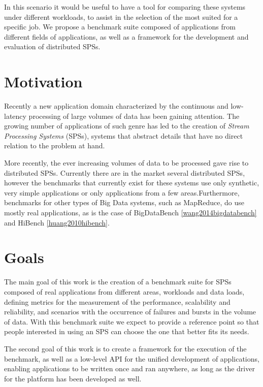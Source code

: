 \documentclass[ppgc,diss,english]{iiufrgs}
\begin{document}
In this scenario it would be useful to have a tool for comparing these systems under different workloads, to assist in the selection of the most suited for a specific job. We propose a benchmark suite composed of applications from different fields of applications, as well as a framework for the development and evaluation of distributed SPSs.

\section{Motivation}

Recently a new application domain characterized by the continuous and low-latency processing of large volumes of data has been gaining attention. The growing number of applications of such genre has led to the creation of \emph{Stream Processing Systems} (SPSs), systems that abstract details that have no direct relation to the problem at hand.

More recently, the ever increasing volumes of data to be processed gave rise to distributed SPSs. Currently there are in the market several distributed SPSs, however the benchmarks that currently exist for these systems use only synthetic, very simple applications or only applications from a few areas.Furthermore, benchmarks for other types of Big Data systems, such as MapReduce, do use mostly real applications, as is the case of BigDataBench \ref{wang2014bigdatabench} and HiBench \ref{huang2010hibench}.

\section{Goals}

The main goal of this work is the creation of a benchmark suite for SPSs composed of real applications from different areas, workloads and data loads, defining metrics for the measurement of the performance, scalability and reliability, and scenarios with the occurrence of failures and bursts in the volume of data. With this benchmark suite we expect to provide a reference point so that people interested in using an SPS can choose the one that better fits its needs.

The second goal of this work is to create a framework for the execution of the benchmark, as well as a low-level API for the unified development of applications, enabling applications to be written once and ran anywhere, as long as the driver for the platform has been developed as well.
\end{document}
